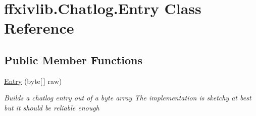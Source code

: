 \hypertarget{classffxivlib_1_1_chatlog_1_1_entry}{\section{ffxivlib.\-Chatlog.\-Entry Class Reference}
\label{classffxivlib_1_1_chatlog_1_1_entry}
}
\subsection*{Public Member Functions}
\begin{DoxyCompactItemize}
\item 
\hyperlink{classffxivlib_1_1_chatlog_1_1_entry_a2b14f09a1008f88b04a9176357fee766}{Entry} (byte\mbox{[}$\,$\mbox{]} raw)
\begin{DoxyCompactList}\small\item\em Builds a chatlog entry out of a byte array The implementation is sketchy at best but it should be reliable enough \end{DoxyCompactList}\end{DoxyCompactItemize}
